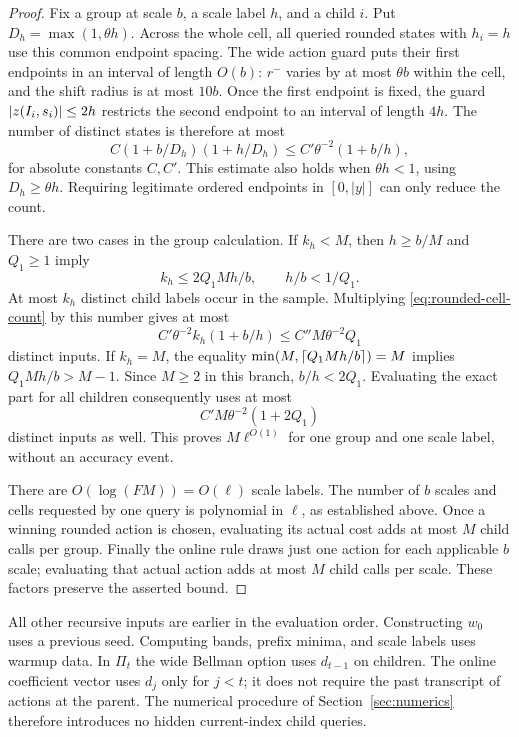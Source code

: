 \begin{proof}
Fix a group at scale $b$, a scale label $h$, and a child $i$.  Put
$D_h=\max(1,\theta h)$.  Across the whole cell, all queried rounded
states with $h_i=h$ use this common endpoint spacing.  The wide
action guard puts their first endpoints in an interval of length
$O(b)$: $r^-$ varies by at most $\theta b$ within the cell, and
the shift radius is at most $10b$.  Once the first endpoint is fixed,
the guard $\lvert z(I_i,s_i)\rvert\le2h$ restricts the second endpoint to
an interval of length $4h$.  The number of distinct states is
therefore at most
\begin{equation}
 C(1+b/D_h)(1+h/D_h)
 \le C'\theta^{-2}(1+b/h),
 \label{eq:rounded-cell-count}
\end{equation}
for absolute constants $C,C'$.  This estimate also holds when
$\theta h<1$, using $D_h\ge\theta h$.  Requiring legitimate ordered
endpoints in $[0,|y|]$ can only reduce the count.

There are two cases in the group calculation.  If $k_h<M$, then
$h\ge b/M$ and $Q_1\ge1$ imply
\[
 k_h\le2Q_1Mh/b,\qquad h/b<1/Q_1.
\]
At most $k_h$ distinct child labels occur in the sample.  Multiplying
\eqref{eq:rounded-cell-count} by this number gives at most
\[
 C'\theta^{-2}k_h(1+b/h)
 \le C''M\theta^{-2}Q_1
\]
distinct inputs.  If $k_h=M$, the equality
$\min(M,\lceil Q_1Mh/b\rceil)=M$ implies
$Q_1Mh/b>M-1$.  Since $M\ge2$ in this branch,
$b/h<2Q_1$.  Evaluating the exact part for all children consequently
uses at most
\[
 C'M\theta^{-2}(1+2Q_1)
\]
distinct inputs as well.  This proves $M\ell^{O(1)}$ for one group
and one scale label, without an accuracy event.

There are $O(\log(FM))=O(\ell)$ scale labels.  The number of $b$
scales and cells requested by one query is polynomial in $\ell$,
as established above.  Once a winning rounded action is chosen,
evaluating its actual cost adds at most $M$ child calls per group.
Finally the online rule draws just one action for each applicable
$b$ scale; evaluating that actual action adds at most $M$ child
calls per scale.  These factors preserve the asserted bound.
\end{proof}

All other recursive inputs are earlier in the evaluation order.
Constructing $w_0$ uses a previous seed.  Computing bands, prefix
minima, and scale labels uses warmup data.  In $\Pi_t$ the wide
Bellman option uses $d_{t-1}$ on children.  The online coefficient
vector uses $d_j$ only for $j<t$; it does not require the past
transcript of actions at the parent.  The numerical procedure of
Section~\ref{sec:numerics} therefore introduces no hidden
current-index child queries.

